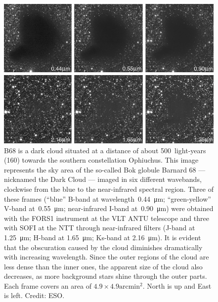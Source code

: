 \begin{figure}
    \centering
    \includegraphics[width=.8\textwidth]{eso9934b}
    \caption{B68 is a dark cloud situated at a distance of about 500~light-years
    (\SI{160}{\parsec})
    towards the southern constellation Ophiuchus.
    This image represents the sky area of the so-called Bok globule Barnard 68 --- nicknamed the Dark Cloud --- imaged in six different wavebands, clockwise from the blue to the near-infrared spectral region.
    Three of these frames
        (``blue'' B-band at wavelength~\SI{0.44}{\micro\meter};
         ``green-yellow'' V-band at~\SI{0.55}{\micro\meter};
         near-infrared I-band at~\SI{0.90}{\micro\meter})
    were obtained with the FORS1 instrument at the VLT ANTU telescope and three with SOFI at the NTT through near-infrared filters
    (J-band at \SI{1.25}{\micro\meter};
    H-band at \SI{1.65}{\micro\meter};
    Ks-band at \SI{2.16}{\micro\meter}).
    It is evident that the obscuration caused by the cloud diminishes dramatically with increasing wavelength.
    Since the outer regions of the cloud are less dense than the inner ones, the apparent size of the cloud also decreases, as more background stars shine through the outer parts.
    Each frame covers an area of
    $4.9 \times 4.9 \operatorname{arcmin^2}$.
    North is up and East is left.  Credit: ESO.}
    \label{fig:dark_cloud}
\end{figure}
